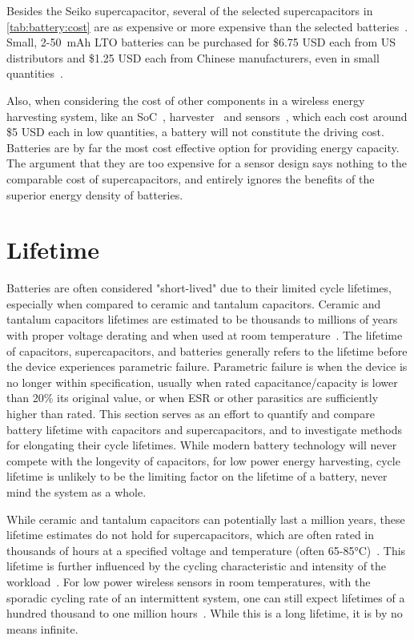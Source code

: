 Besides the Seiko supercapacitor, several of the selected supercapacitors in \cref{tab:battery:cost} are as expensive or more expensive than the selected batteries~\cite{murataCap,kemetCap,seikoCap,bestCap}.
Small, 2-50~mAh LTO batteries can be purchased for
\$6.75 USD each from US distributors and \$1.25 USD each from Chinese manufacturers, even in small quantities~\cite{LTODatasheet, LTODatasheet2}. 

Also, when considering the cost of other components in a wireless energy harvesting system, like
an SoC~\cite{nrf52840}, harvester~\cite{sanyoSolarCell} and sensors~\cite{si7021},
which each cost around \$5 USD each in low quantities, a battery will not constitute
the driving cost. Batteries are by far the most cost effective option for providing energy capacity. The argument that they are too expensive for a sensor design says nothing to the comparable cost of supercapacitors, and entirely ignores the benefits of the superior energy density of batteries. 


\section{Lifetime}
Batteries are often considered "short-lived" due to their limited cycle lifetimes, especially when compared to ceramic and tantalum capacitors. 
Ceramic and tantalum capacitors lifetimes are estimated to be thousands to millions of years with proper voltage derating and when used at room temperature~\cite{kemetLife}. 
The lifetime of capacitors, supercapacitors, and batteries generally refers to the lifetime before the device experiences parametric failure. Parametric failure is when the device is no longer within specification, usually when rated capacitance/capacity is lower than 20\% its original value, or when ESR or other parasitics are sufficiently higher than rated.
This section serves as an effort to quantify and compare battery lifetime with capacitors and supercapacitors, and to investigate methods for elongating their cycle lifetimes.
While modern battery technology will never compete with the longevity of capacitors, for low power energy harvesting, cycle lifetime is unlikely to be the limiting factor on the lifetime of a battery, never mind the system as a whole. 

While ceramic and tantalum capacitors can potentially last a million years, these lifetime estimates do not hold for supercapacitors, which are often rated in thousands of hours at a specified voltage and temperature (often 65-85\si{\celsius})~\cite{bestCap,murataCap}. This lifetime is further influenced by the cycling characteristic and intensity of the workload~\cite{kreczanik2013study}. For low power wireless sensors in room temperatures, with the sporadic cycling rate of an intermittent system, one can still expect lifetimes of a hundred thousand to one million hours~\cite{kreczanik2013study}. While this is a long lifetime, it is by no means infinite.

